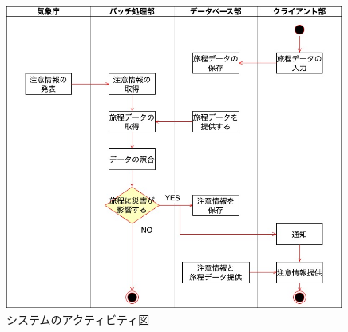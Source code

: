 \begin{figure}[H]
  \centering
  \includegraphics[height=10cm]{figure32.jpg}
  \caption{システムのアクティビティ図}
  \label{fig:activity}
\end{figure}